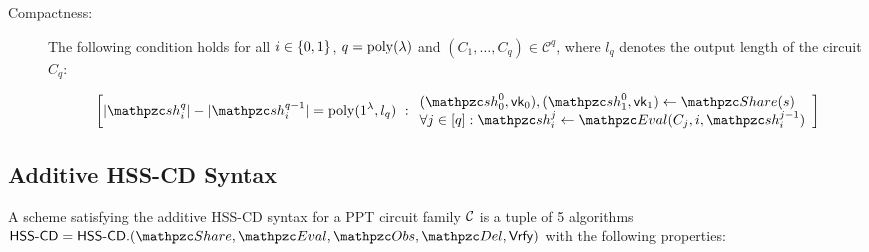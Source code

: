 \begin{description}
\item [Compactness:] The following condition holds for all $i \in
\{0,1\}$, $q = {\mathrm{poly}}(\lambda)$ and $(C_1, \ldots, C_q) \in
\mathcal{C}^q$, where $l_q$ denotes the output length of the circuit
$C_q$:

\begin{align}
\left[
|\qsh_i^q| - |\qsh_i^{q-1}| = \poly(1^\secp, l_q)
\ :
\begin{array}{ll}
(\qsh_0^0, \vk_0), (\qsh_1^0, \vk_1) \gets \Sh(s)\\
\forall j \in [q]: \qsh_i^j \leftarrow \Ev(C_j, i,
\qsh_i^{j-1})\\
\end{array}
\right]
\end{align}
\end{description}

\subsection{Additive HSS-CD Syntax}

A scheme satisfying the additive HSS-CD syntax for a PPT circuit
family $\mathcal{C}$ is a tuple of 5
algorithms $\HSScd = \HSScd.(\Sh, \Ev, \Obs, \Del, \Vrfy)$ with the
following properties:

